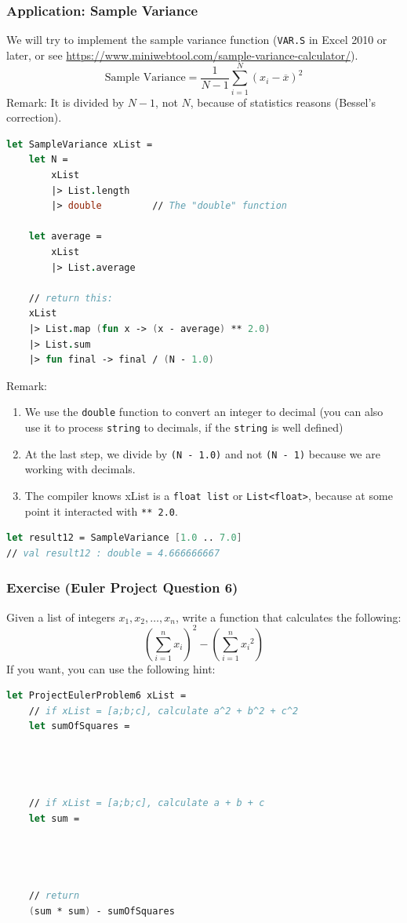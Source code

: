 \documentclass[12pt]{article}
\begin{document}
\subsubsection*{Application: Sample Variance}
We will try to implement the sample variance function (\texttt{VAR.S} in Excel 2010 or later, or see \url{https://www.miniwebtool.com/sample-variance-calculator/}).
\[
\text{Sample Variance} = \dfrac{1}{N - 1} \sum_{i=1}^N \left(x_i - \overline{x}\right)^2
\]
Remark: It is divided by $N-1$, not $N$, because of statistics reasons (Bessel's correction).
\begin{lstlisting}[language=FSharp]
let SampleVariance xList =
    let N = 
        xList
        |> List.length
        |> double         // The "double" function 

    let average = 
        xList
        |> List.average

    // return this:
    xList
    |> List.map (fun x -> (x - average) ** 2.0)
    |> List.sum
    |> fun final -> final / (N - 1.0)       
\end{lstlisting}
Remark:
\begin{enumerate}
\item We use the \texttt{double} function to convert an integer to decimal (you can also use it to process \texttt{string} to decimals, if the \texttt{string} is well defined)
\item At the last step, we divide by \texttt{(N - 1.0)} and not \texttt{(N - 1)} because we are working with decimals.
\item The compiler knows xList is a \texttt{float list} or \texttt{List<float>}, because at some point it interacted with \texttt{** 2.0}. 
\end{enumerate}
\begin{lstlisting}[language=FSharp]
let result12 = SampleVariance [1.0 .. 7.0]      
// val result12 : double = 4.666666667
\end{lstlisting}

\pagebreak

\subsubsection*{Exercise (Euler Project Question 6)}
Given a list of integers $x_1, x_2, \ldots, x_n$, write a function that calculates the following:
\[
\left(\sum_{i=1}^n x_i\right)^2 - \left(\sum_{i=1}^n {x_i}^2\right)
\]
If you want, you can use the following hint:
\begin{lstlisting}[language=FSharp]
let ProjectEulerProblem6 xList =
    // if xList = [a;b;c], calculate a^2 + b^2 + c^2
    let sumOfSquares = 




    // if xList = [a;b;c], calculate a + b + c
    let sum =




    // return
    (sum * sum) - sumOfSquares
\end{lstlisting}
\end{document}
